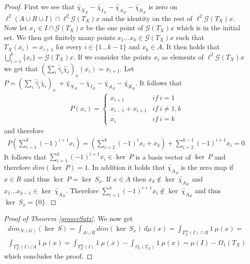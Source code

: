 \documentclass[12pt,a4paper]{scrartcl}
\numberwithin{equation}{section}
\newcommand{\2}{\mathbb{Z} / 2 \mathbb{Z}}
\newcommand{\G}{\mathcal{G}}
\newcommand{\1}{\bar{1}}
\newcommand{\0}{\bar{0}}
\begin{document}
\begin{proof}
	First we see that $\tilde{\chi_X}_x - \tilde{\chi_I}_x - \tilde{\chi_A}_x - \tilde{\chi_R}_x$ is zero on $\ell^2(A \cup R \cup I) \cap \ell^2 \G (T_X)x$ and the identity on the rest of $\ell^2 \G (T_X)x$. Now let $x_1 \in I \cap \G (T_X)x$ be the one point of $\G (T_X)x$ which is in the initial set. We then get finitely many points $x_1 \ldots x_k \in \G (T_X)x$ such that $T_X(x_i) = x_{i + 1}$ for every $i \in \{1 \ldots k - 1\}$ and $x_k \in A$. It then holds that $\bigcup_{i = 1}^{k} \{x_i\} = \G (T_X)x$. If we consider the points $x_i$ as elements of $\ell^2 \G (T_X)x$ we get that $(\sum_{i} \tilde{\bar{\gamma_i}} \tilde{\chi_i})_x(x_i) =x_{i+1}$. Let $P = (\sum_{i} \tilde{\bar{\gamma_i}} \tilde{\chi_i})_x \ + \tilde{\chi_X}_x - \tilde{\chi_I}_x - \tilde{\chi_A}_x - \tilde{\chi_R}_x$. It follows that
	\begin{align*}
		P(x_i) = \begin{cases}
		x_{i + 1} & if \ i = 1 \\
		x_{i - 1} + x_{i + 1} & if \ i \neq 1, k \\
		x_{i} & if \ i = k
		\end{cases}
	\end{align*}
	and therefore 
	\begin{align*}
		P(\sum_{i = 1}^{k} (-1)^{i + 1} x_i) = (\sum_{i = 2}^{k} (-1)^{i} x_{i} + x_k) + \sum_{i = 2}^{k - 1} (-1)^{i + 1} x_{i} = 0.
	\end{align*}
	It follows that $\sum_{i = 1}^{k} (-1)^{i + 1} x_i \in \ker \ P$ is a basis vector of $ \ker \ P$ and therefore $dim(\ker \ P) = 1$. In addition it holds that $\tilde{\chi_A}_x$ is the zero map if $x \in R$ and thus $\ker \ P = \ker \ S_x$. If $x \in A$ then $x_k \notin \ker \ \tilde{\chi_A}_x$ and $x_1 \ldots x_{k - 1} \in \ker \ \tilde{\chi_A}_x$. Therefore $\sum_{i = 1}^{k} (-1)^{i + 1} x_i \notin \ker \ \tilde{\chi_A}_x$ and thus $\ker \ S_x = \{0\}$.
\end{proof}
\begin{proof}[Proof of Theorem \ref{groserSatz}]
	We now get
	\begin{align*}
		dim_{\mathcal{N}(G)}(\ker \ S) = \int_{A \cup R} dim (\ker \ S_x) \ d \mu (x) = \int_{T_X^\infty(I) \cap R} 1 \ \mu (x) = \\ \int_{T_X^\infty(I) / A} 1 \ \mu (x) = \int_{T_X^\infty(I)} 1 \ \mu (x) - \int_{\Omega_1(T_X)} 1 \ \mu (x) = \mu(I) - \Omega_1(T_X)
	\end{align*}
	which concludes the proof. 
\end{proof}
\end{document}
